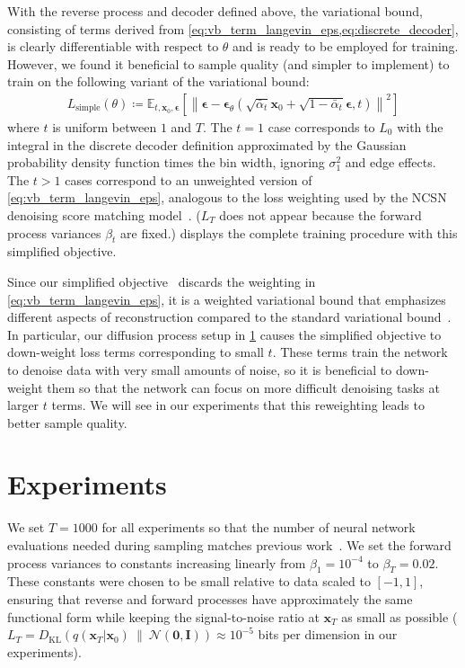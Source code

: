 \documentclass{article}
\newcommand{\defeq}{\coloneqq}
\newcommand{\E}{\mathbb{E}}
\newcommand{\Eb}[2]{\E_{#1}\!\left[#2\right]}
\newcommand{\kl}[2]{D_{\mathrm{KL}}\!\left(#1 ~ \| ~ #2\right)}
\newcommand{\bI}{\mathbf{I}}
\newcommand{\bzero}{\mathbf{0}}
\newcommand{\bx}{\mathbf{x}}
\newcommand{\bepsilon}{{\boldsymbol{\epsilon}}}
\begin{document}
With the reverse process and decoder defined above, the variational bound, consisting of terms derived from \cref{eq:vb_term_langevin_eps,eq:discrete_decoder}, is clearly differentiable with respect to $\theta$ and is ready to be employed for training. However, we found it beneficial to sample quality (and simpler to implement) to train on the following variant of the variational bound:
\begin{align}
 L_\mathrm{simple}(\theta) \defeq \Eb{t, \bx_0, \bepsilon}{ \left\| \bepsilon - \bepsilon_\theta(\sqrt{\bar\alpha_t} \bx_0 + \sqrt{1-\bar\alpha_t}\bepsilon, t) \right\|^2} \label{eq:training_objective_simple}
\end{align}
where $t$ is uniform between $1$ and $T$. The $t=1$ case corresponds to $L_0$ with the integral in the discrete decoder definition  approximated by the Gaussian probability density function times the bin width, ignoring $\sigma_1^2$ and edge effects. The $t > 1$ cases correspond to an unweighted version of \cref{eq:vb_term_langevin_eps}, analogous to the loss weighting used by the NCSN denoising score matching model~\citep{song2019generative}. ($L_T$ does not appear because the forward process variances $\beta_t$ are fixed.)
 displays the complete training procedure with this simplified objective.

Since our simplified objective~ discards the weighting in \cref{eq:vb_term_langevin_eps}, it is a weighted variational bound that emphasizes different aspects of reconstruction compared to the standard variational bound~\citep{gregor2016towards,higgins2017beta}.
In particular, our diffusion process setup in \cref{sec:experiments} causes the simplified objective to down-weight loss terms corresponding to small $t$. These terms train the network to denoise data with very small amounts of noise, so it is beneficial to down-weight them so that the network can focus on more difficult denoising tasks at larger $t$ terms. We will see in our experiments that this reweighting leads to better sample quality.

\section{Experiments}
\label{sec:experiments}

We set $T=1000$ for all experiments so that the number of neural network evaluations needed during sampling matches previous work~\citep{sohl2015deep,song2019generative}. We set the forward process variances to constants increasing linearly from $\beta_1 = 10^{-4}$ to $\beta_T = 0.02$. These constants were chosen to be small relative to data scaled to $[-1, 1]$, ensuring that reverse and forward processes have approximately the same functional form while keeping the signal-to-noise ratio at $\bx_T$ as small as possible ($L_T = \kl{q(\bx_T|\bx_0)}{\mathcal{N}(\bzero, \bI)} \approx 10^{-5}$ bits per dimension in our experiments).
\end{document}
